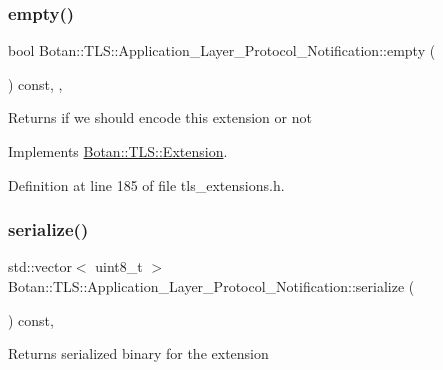 \subsubsection{\texorpdfstring{empty()}{empty()}}
{\footnotesize\ttfamily bool Botan\+::\+T\+L\+S\+::\+Application\+\_\+\+Layer\+\_\+\+Protocol\+\_\+\+Notification\+::empty (\begin{DoxyParamCaption}{ }\end{DoxyParamCaption}) const\hspace{0.3cm}{\ttfamily [inline]}, {\ttfamily [override]}, {\ttfamily [virtual]}}

\begin{DoxyReturn}{Returns}
if we should encode this extension or not 
\end{DoxyReturn}


Implements \mbox{\hyperlink{class_botan_1_1_t_l_s_1_1_extension_aa850b9be2322f94e7c65e583cd51acc5}{Botan\+::\+T\+L\+S\+::\+Extension}}.



Definition at line 185 of file tls\+\_\+extensions.\+h.

\mbox{\label{class_botan_1_1_t_l_s_1_1_application___layer___protocol___notification_af665dac05218679d77fbd990e877d3d1}} 
\subsubsection{\texorpdfstring{serialize()}{serialize()}}
{\footnotesize\ttfamily std\+::vector$<$ uint8\+\_\+t $>$ Botan\+::\+T\+L\+S\+::\+Application\+\_\+\+Layer\+\_\+\+Protocol\+\_\+\+Notification\+::serialize (\begin{DoxyParamCaption}{ }\end{DoxyParamCaption}) const\hspace{0.3cm}{\ttfamily [override]}, {\ttfamily [virtual]}}

\begin{DoxyReturn}{Returns}
serialized binary for the extension 
\end{DoxyReturn}


